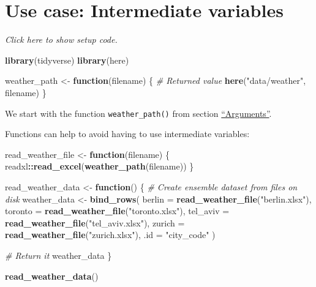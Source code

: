 \documentclass[]{book}
\newenvironment{Shaded}{\begin{snugshade}}{\end{snugshade}}
\newcommand{\CommentTok}[1]{\textcolor[rgb]{0.56,0.35,0.01}{\textit{#1}}}
\newcommand{\ControlFlowTok}[1]{\textcolor[rgb]{0.13,0.29,0.53}{\textbf{#1}}}
\newcommand{\DataTypeTok}[1]{\textcolor[rgb]{0.13,0.29,0.53}{#1}}
\newcommand{\KeywordTok}[1]{\textcolor[rgb]{0.13,0.29,0.53}{\textbf{#1}}}
\newcommand{\NormalTok}[1]{#1}
\newcommand{\OperatorTok}[1]{\textcolor[rgb]{0.81,0.36,0.00}{\textbf{#1}}}
\newcommand{\StringTok}[1]{\textcolor[rgb]{0.31,0.60,0.02}{#1}}
\begin{document}
\hypertarget{intermediate}{%
\section{Use case: Intermediate variables}\label{intermediate}}

\emph{Click here to show setup code.}

\begin{Shaded}
\begin{Highlighting}[]
\KeywordTok{library}\NormalTok{(tidyverse)}
\KeywordTok{library}\NormalTok{(here)}

\NormalTok{weather_path <-}\StringTok{ }\ControlFlowTok{function}\NormalTok{(filename) \{}
  \CommentTok{# Returned value}
  \KeywordTok{here}\NormalTok{(}\StringTok{"data/weather"}\NormalTok{, filename)}
\NormalTok{\}}
\end{Highlighting}
\end{Shaded}

We start with the function \texttt{weather\_path()} from section \protect\hyperlink{args}{``Arguments''}.

Functions can help to avoid having to use intermediate variables:

\begin{Shaded}
\begin{Highlighting}[]
\NormalTok{read_weather_file <-}\StringTok{ }\ControlFlowTok{function}\NormalTok{(filename) \{}
\NormalTok{  readxl}\OperatorTok{::}\KeywordTok{read_excel}\NormalTok{(}\KeywordTok{weather_path}\NormalTok{(filename))}
\NormalTok{\}}

\NormalTok{read_weather_data <-}\StringTok{ }\ControlFlowTok{function}\NormalTok{() \{}
  \CommentTok{# Create ensemble dataset from files on disk}
\NormalTok{  weather_data <-}\StringTok{ }\KeywordTok{bind_rows}\NormalTok{(}
    \DataTypeTok{berlin =} \KeywordTok{read_weather_file}\NormalTok{(}\StringTok{"berlin.xlsx"}\NormalTok{),}
    \DataTypeTok{toronto =} \KeywordTok{read_weather_file}\NormalTok{(}\StringTok{"toronto.xlsx"}\NormalTok{),}
    \DataTypeTok{tel_aviv =} \KeywordTok{read_weather_file}\NormalTok{(}\StringTok{"tel_aviv.xlsx"}\NormalTok{),}
    \DataTypeTok{zurich =} \KeywordTok{read_weather_file}\NormalTok{(}\StringTok{"zurich.xlsx"}\NormalTok{),}
    \DataTypeTok{.id =} \StringTok{"city_code"}
\NormalTok{  )}

  \CommentTok{# Return it}
\NormalTok{  weather_data}
\NormalTok{\}}

\KeywordTok{read_weather_data}\NormalTok{()}
\end{Highlighting}
\end{Shaded}
\end{document}
